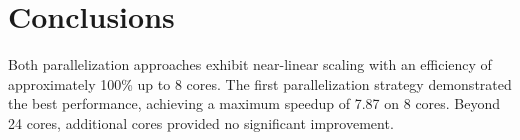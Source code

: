 \section{Conclusions}
Both parallelization approaches exhibit near-linear scaling with an efficiency of approximately 100\% up to 8 cores. 
The first parallelization strategy demonstrated the best performance, achieving a maximum speedup of 7.87 on 8 cores. 
Beyond 24 cores, additional cores provided no significant improvement.